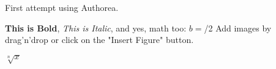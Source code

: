 First attempt using Authorea.

\textbf{This is Bold}, \textit{This is Italic}, and yes, math too: $b = $/2 Add images by drag'n'drop or click on the "Insert Figure" button.

$\sqrt[n]{x}$